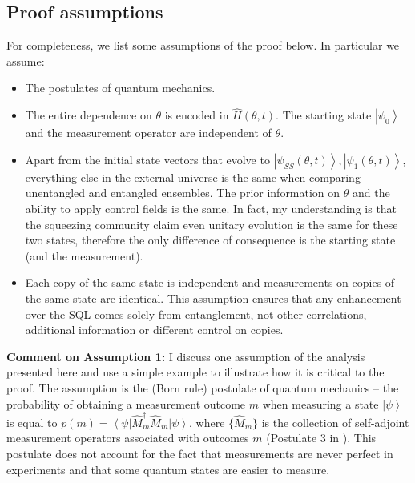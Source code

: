 \documentclass[reqno]{amsart}
\newcommand{\ket}[1]{\left| #1 \right>}
\newcommand{\bra}[1]{\left< #1 \right|}
\newcommand{\hham}{\hat{H}}
\begin{document}
\subsection{Proof assumptions}\label{App:Assumptions}
For completeness, we list some assumptions of the proof below. In particular we assume:
\begin{itemize}
\item The postulates of quantum mechanics.
\item The entire dependence on $\theta$ is encoded in $\hham(\theta,t)$. The starting state $\ket{\psi_0}$ and the measurement operator are independent of $\theta$.
\item Apart from the initial state vectors that evolve to $\ket{\psi_{SS}(\theta,t)}, \ket{\psi_1(\theta,t)}$, everything else in the external universe is the same when comparing unentangled and entangled ensembles. The prior information on $\theta$ and the ability to apply control fields is the same. In fact, my understanding is that the squeezing community claim even unitary evolution is the same for these two states, therefore the only difference of consequence is the starting state (and the measurement).
\item Each copy of the same state is independent and measurements on copies of the same state are identical. This assumption ensures that any enhancement over the SQL comes solely from entanglement, not other correlations, additional information or different control on copies.
\end{itemize}
\textbf{Comment on Assumption 1:}
I discuss one assumption of the analysis presented here and use a simple example to illustrate how it is critical to the proof. The assumption is the (Born rule) postulate of quantum mechanics -- the probability of obtaining a measurement outcome $m$ when measuring a state $\ket{\psi}$ is equal to $p(m) = \bra{\psi}\hat{M}^{\dagger}_m \hat{M}_m\ket{\psi}$, where $\{\hat{M}_m\}$ is the collection of self-adjoint measurement operators associated with outcomes $m$ (Postulate 3 in \cite{Nielsen2000}). This postulate does not account for the fact that measurements are never perfect in experiments and that some quantum states are easier to measure.
\end{document}

